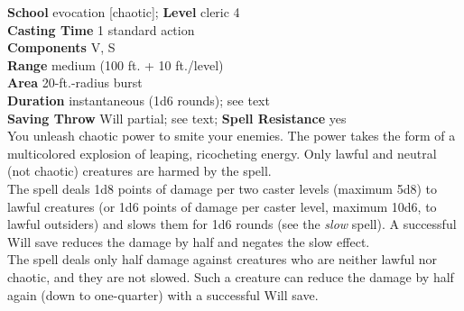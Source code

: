 \textbf{School} evocation [chaotic]; \textbf{Level} cleric 4\\
\textbf{Casting Time} 1 standard action\\
\textbf{Components} V, S\\
\textbf{Range }medium (100 ft. + 10 ft./level)\\
\textbf{Area} 20-ft.-radius burst\\
\textbf{Duration} instantaneous (1d6 rounds); see text\\
\textbf{Saving Throw }Will partial; see text; \textbf{Spell Resistance} yes\\
You unleash chaotic power to smite your enemies. The power takes the form of a multicolored explosion of leaping, ricocheting energy. Only lawful and neutral (not chaotic) creatures are harmed by the spell.\\
The spell deals 1d8 points of damage per two caster levels (maximum 5d8) to lawful creatures (or 1d6 points of damage per caster level, maximum 10d6, to lawful outsiders) and slows them for 1d6 rounds (see the \textit{slow} spell). A successful Will save reduces the damage by half and negates the slow effect.\\
The spell deals only half damage against creatures who are neither lawful nor chaotic, and they are not slowed. Such a creature can reduce the damage by half again (down to one-quarter) with a successful Will save.\\
